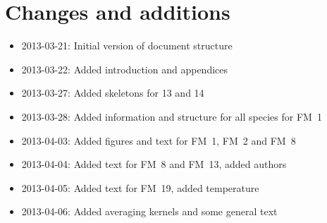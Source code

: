 \chapter{Changes and additions}
\label{ch:changes}

\begin{itemize}
    \item 2013-03-21: Initial version of document structure
    \item 2013-03-22: Added introduction and appendices
    \item 2013-03-27: Added skeletons for 13 and 14
    \item 2013-03-28: Added information and structure for all species for FM~1
    \item 2013-04-03: Added figures and text for FM~1, FM~2 and FM~8
    \item 2013-04-04: Added text for FM~8 and FM~13, added authors
    \item 2013-04-05: Added text for FM~19, added temperature
    \item 2013-04-06: Added averaging kernels and some general text
\end{itemize}
